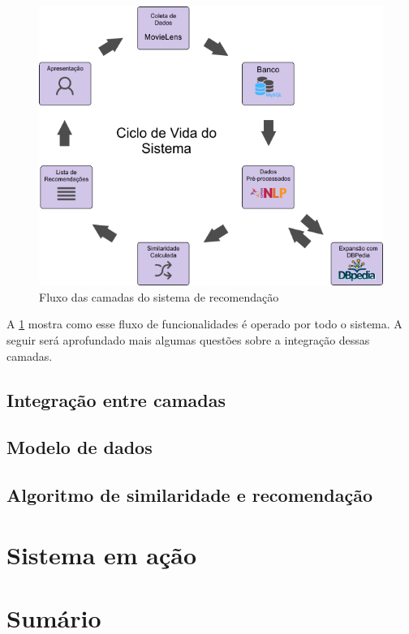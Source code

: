 \begin{figure}
	\centering
	\includegraphics[scale=0.80]{imagens/recsys_fluxo.png}
	\caption{Fluxo das camadas do sistema de recomendação}
	\label{fig:recsys_fluxo}
\end{figure}

A \ref{fig:recsys_fluxo} mostra como esse fluxo de funcionalidades é operado por todo o sistema. A seguir será aprofundado mais algumas questões sobre a integração dessas camadas.

\subsection{Integração entre camadas}

\subsection{Modelo de dados}

\label{ssec:dataModel}

\subsection{Algoritmo de similaridade e recomendação}

\label{ssec:recsysAlgo}

\section{Sistema em ação}

\section{Sumário}

\label{cap:proposal}
